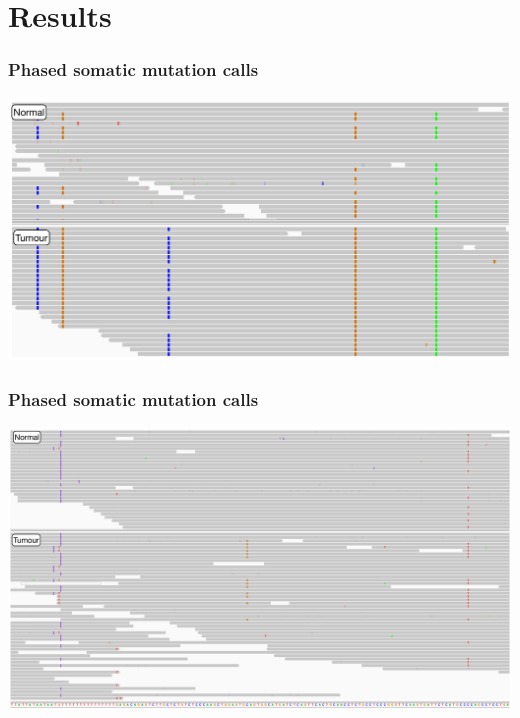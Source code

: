 \documentclass{beamer}
\begin{document}
\begin{frame}[fragile]

\end{frame}

\section{Results}

\begin{frame}
\frametitle{Phased somatic mutation calls}

\begin{center}
    \includegraphics[width=\linewidth]{images/spike_in2}
\end{center}

\end{frame}

\begin{frame}
\frametitle{Phased somatic mutation calls}

\begin{center}
    \includegraphics[width=\linewidth]{images/spike_in}
\end{center}

\end{frame}
\end{document}
